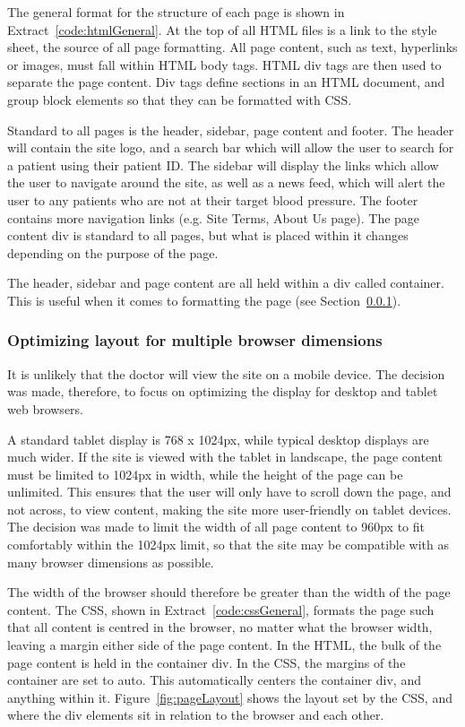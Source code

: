 \documentclass[11pt]{article}
\begin{document}
The general format for the structure of each page is shown in Extract~\ref{code:htmlGeneral}. At the top of all HTML files is a link to the style sheet, the source of all page formatting. All page content, such as text, hyperlinks or images, must fall within HTML body tags. HTML div tags are then used to separate the page content. Div tags define sections in an HTML document, and group block elements so that they can be formatted with CSS.

Standard to all pages is the header, sidebar, page content and footer. The header will contain the site logo, and a search bar which will allow the user to search for a patient using their patient ID. The sidebar will display the links which allow the user to navigate around the site, as well as a news feed, which will alert the user to any patients who are not at their target blood pressure. The footer contains more navigation links (e.g. Site Terms, About Us page). The page content div is standard to all pages, but what is placed within it changes depending on the purpose of the page.

The header, sidebar and page content are all held within a div called container. This is useful when it comes to formatting the page (see Section~\ref{sec:CSS}).

\subsubsection{Optimizing layout for multiple browser dimensions}
\label{sec:CSS}
It is unlikely that the doctor will view the site on a mobile device. The decision was made, therefore, to focus on optimizing the display for desktop and tablet web browsers.

A standard tablet display is 768 x 1024px, while typical desktop displays are much wider. If the site is viewed with the tablet in landscape, the page content must be limited to 1024px in width, while the height of the page can be unlimited. This ensures that the user will only have to scroll down the page, and not across, to view content, making the site more user-friendly on tablet devices. The decision was made to limit the width of all page content to 960px to fit comfortably within the 1024px limit, so that the site may be compatible with as many browser dimensions as possible.

The width of the browser should therefore be greater than the width of the page content. The CSS, shown in Extract~\ref{code:cssGeneral}, formats the page such that all content is centred in the browser, no matter what the browser width, leaving a margin either side of the page content. In the HTML, the bulk of the page content is held in the container div. In the CSS, the margins of the container are set to auto. This automatically centers the container div, and anything within it. Figure~\ref{fig:pageLayout} shows the layout set by the CSS, and where the div elements sit in relation to the browser and each other.
\end{document}
